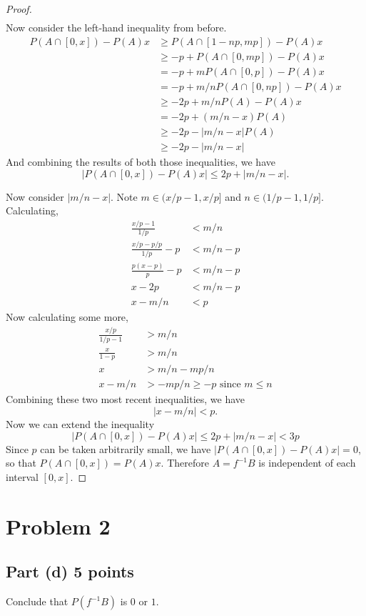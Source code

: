 \documentclass[letterpaper, 12pt]{article}
\begin{document}
\begin{proof}
\begin{align*}
\end{align*}
Now consider the left-hand inequality from before.
\begin{align*}
P(A \cap [0,x]) - P(A)x &\geq P(A \cap [1 - np,mp]) - P(A)x \\
&\geq -p + P(A \cap [0,mp]) - P(A)x \\
&= -p + m P(A \cap [0,p]) - P(A)x \\
&= -p + m/n P(A \cap [0,np]) - P(A)x \\
&\geq -2p + m/n P(A) - P(A)x \\
&= -2p + (m/n - x) P(A) \\
&\geq -2p - |m/n -x| P(A) \\
&\geq -2p - |m/n - x|
\end{align*}
And combining the results of both those inequalities, we have 
\[
|P(A \cap [0,x]) - P(A)x | \leq 2p +  |m/n - x|
\text{.}
\]

Now consider $|m/n - x|$. Note $m \in (x/p -1, x/p]$ and $n \in (1/p -1 , 1/p]$. Calculating,
\begin{align*}
\frac{x/p - 1}{1/p} &< m/n \\
\frac{x/p - p/p}{1/p} - p &< m/n -p \\
\frac{p(x - p)}{p} - p &< m/n -p \\
x - 2p &< m/n - p \\
x - m/n &< p
\end{align*}
Now calculating some more,
\begin{align*}
\frac{x/p}{1/p -1} &> m/n \\
\frac{x}{1-p} &> m/n \\
x &> m/n - mp/n \\
x - m/n &> -mp/n \geq -p 
\text{ since $m \leq n$}
\end{align*}
Combining these two most recent inequalities, we have 
\[
|x - m/n| < p
\text{.}
\]
Now we can extend the inequality
\[
|P(A \cap [0,x]) - P(A)x | \leq 2p +  |m/n - x| < 3p
\]
Since $p$ can be taken arbitrarily small, we have $|P(A \cap [0,x]) - P(A)x | = 0$, so that $P(A \cap [0,x]) = P(A)x$. 
Therefore $A = f^{-1}B$ is independent of each interval $[0,x]$. 
\end{proof}

\pagebreak

\section*{Problem 2}
\subsection*{Part (d) 5 points}
Conclude that $P(f^{-1}B)$ is $0$ or $1$.
\end{document}
